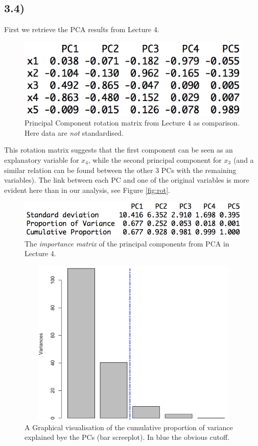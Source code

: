 \documentclass[a4paper,11pt,oneside]{report}
\begin{document}
\subsection*{3.4)}
	First we retrieve the PCA results from Lecture 4.
	\begin{figure}[H]
	\centering
	\includegraphics{pca_De_Blasi.png}
	\caption{Principal Component rotation matrix from Lecture 4 as comparison. Here data are \textit{not} standardised.}
	\end{figure}
	This rotation matrix suggests that the first component can be seen as an explanatory variable for $x_4$, while the second principal component for $x_3$ (and a similar relation can be found between the other 3 PCs with the remaining variables). The link between each PC and one of the original variables is more evident here than in our analysis, see Figure \ref{fig:rot}.
	\begin{figure}[H]
	\centering
	\includegraphics{pca_De_Blasi_importance.png}
	\caption{The \textit{importance matrix} of the principal components from PCA in Lecture 4.}
	\end{figure}
	\begin{figure}[H]
	\centering
	\includegraphics[height = 8cm, width = 13cm]{screeplot_bar_De_Blasi.png}
	\caption{A Graphical visualisation of the cumulative proportion of variance explained bye the PCs (bar screeplot). In blue the obvious cutoff.}
	\end{figure}
	
\end{document}
